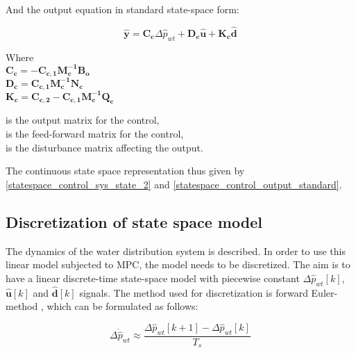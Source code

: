 And the output equation in standard state-space form:

\begin{equation}
  \bm{\hat{y}} = \bm{C_c} \Delta \hat{p}_{wt} + \bm{D_c} \bm{\hat{u}} + \bm{K_c} \bm{\hat{d}}
\label{statespace_control_output_standard}
\end{equation}

\begin{minipage}[t]{0.40\textwidth}
Where\\
\hspace*{8mm} $\bm{C_c} = -\bm{C_{c,1}}\bm{M_c^{-1}}\bm{B_o} $ \\
\hspace*{8mm} $\bm{D_c} =  \bm{C_{c,1}}\bm{M_c^{-1}}\bm{N_c} $ \\
\hspace*{8mm} $\bm{K_c} = \bm{C_{c,2}} -\bm{C_{c,1}}\bm{M_c^{-1}}\bm{Q_c} $
\end{minipage}
\begin{minipage}[t]{0.58\textwidth}
\vspace*{1mm}
is the output matrix for the control, \\
is the feed-forward matrix for the control, \\
is the disturbance matrix affecting the output.
\end{minipage} 

The continuous state space representation thus given by \eqref{statespace_control_sys_state_2} and \eqref{statespace_control_output_standard}.

\subsection{Discretization of state space model}
 \label{discrete_SS}
 
The dynamics of the water distribution system is described. In order to use this linear model subjected to MPC, the model needs to be discretized. The aim is to have a linear discrete-time state-space model with piecewise constant $\Delta \hat{p}_{wt}[k]$, $\bm{\hat{u}}[k]$ and $\bm{\hat{d}}[k]$ signals. The method used for discretization is forward Euler-method \citep{franklin1994feedback}, which can be formulated as follows:

\begin{equation}
\Delta \dot{\hat{p}}_{wt} \approx  \frac{\Delta \hat{p}_{wt}[k+1] - \Delta\hat{p}_{wt}[k]}{T_s} 
 \label{statespace_discrete_state1}
\end{equation}

